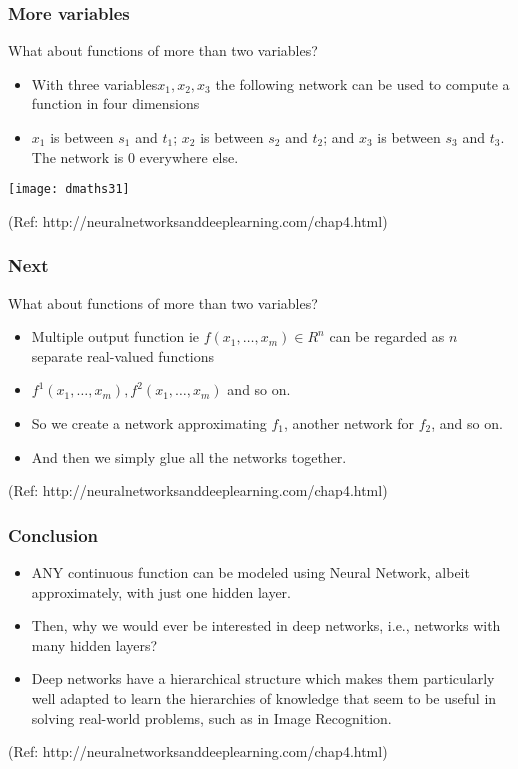 \begin{frame}[fragile] \frametitle{More variables}
What about functions of more than two variables?
\begin{itemize}
\item With three variables$ x_1,x_2,x_3$ the following network can be used to compute a function in four dimensions
\item $x_1$ is between $s_1$ and $t_1$; $x_2$ is between $s_2$ and $t_2$; and $x_3$ is between $s_3$ and $t_3$. The network is 0 everywhere else. 
\end{itemize}

\begin{center}
\texttt{[image: dmaths31]}
\end{center}
{\tiny (Ref: http://neuralnetworksanddeeplearning.com/chap4.html)}
\end{frame}

\begin{frame}[fragile] \frametitle{Next}
What about functions of more than two variables?
\begin{itemize}
\item Multiple output function ie  $f(x_1, \ldots, x_m) \in R^n$ can be regarded as $n$ separate real-valued functions
\item $f^1(x_1,\ldots, x_m), f^2(x_1, \ldots, x_m)$ and so on.
\item So we create a network approximating $f_1$, another network for $f_2$, and so on. 
\item And then we simply glue all the networks together. 
\end{itemize}


{\tiny (Ref: http://neuralnetworksanddeeplearning.com/chap4.html)}
\end{frame}

\begin{frame}[fragile] \frametitle{Conclusion}
\begin{itemize}
\item ANY continuous function can be modeled using Neural Network, albeit approximately, with just one hidden layer.
\item  Then, why we would ever be interested in deep networks, i.e., networks with many hidden layers?
\item Deep networks have a hierarchical structure which makes them particularly well adapted to learn the hierarchies of knowledge that seem to be useful in solving real-world problems, such as in Image Recognition. 
\end{itemize}


{\tiny (Ref: http://neuralnetworksanddeeplearning.com/chap4.html)}
\end{frame}

